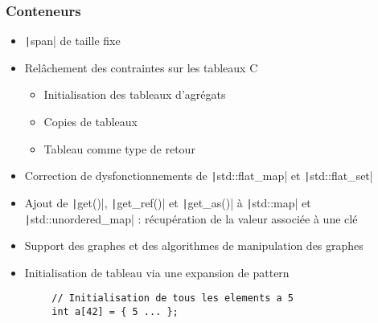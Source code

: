 \documentclass[C++.tex]{subfiles}
\begin{document}
\begin{frame}[fragile]
	\frametitle{Conteneurs}
	\begin{itemize}
		\item \texttt|span| de taille fixe
		\item Relâchement des contraintes sur les tableaux C
		\begin{itemize}
			\item Initialisation des tableaux d'agrégats
			\item Copies de tableaux
			\item Tableau comme type de retour
		\end{itemize}
		\item Correction de dysfonctionnements de \texttt|std::flat_map| et \texttt|std::flat_set|
		\item Ajout de \texttt|get()|, \texttt|get_ref()| et \texttt|get_as()| à \texttt|std::map| et \texttt|std::unordered_map| : récupération de la valeur associée à une clé
		\item Support des graphes et des algorithmes de manipulation des graphes
		\item Initialisation de tableau via une expansion de pattern
	\end{itemize}

	\begin{verbatim}
		// Initialisation de tous les elements a 5
		int a[42] = { 5 ... };
	\end{verbatim}

\end{frame}
\end{document}

